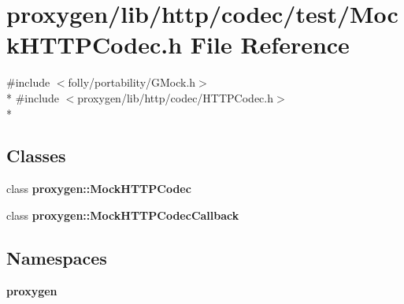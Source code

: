 \section{proxygen/lib/http/codec/test/\+Mock\+H\+T\+T\+P\+Codec.h File Reference}
\label{MockHTTPCodec_8h}
{\ttfamily \#include $<$folly/portability/\+G\+Mock.\+h$>$}\\*
{\ttfamily \#include $<$proxygen/lib/http/codec/\+H\+T\+T\+P\+Codec.\+h$>$}\\*
\subsection*{Classes}
\begin{DoxyCompactItemize}
\item 
class {\bf proxygen\+::\+Mock\+H\+T\+T\+P\+Codec}
\item 
class {\bf proxygen\+::\+Mock\+H\+T\+T\+P\+Codec\+Callback}
\end{DoxyCompactItemize}
\subsection*{Namespaces}
\begin{DoxyCompactItemize}
\item 
 {\bf proxygen}
\end{DoxyCompactItemize}
